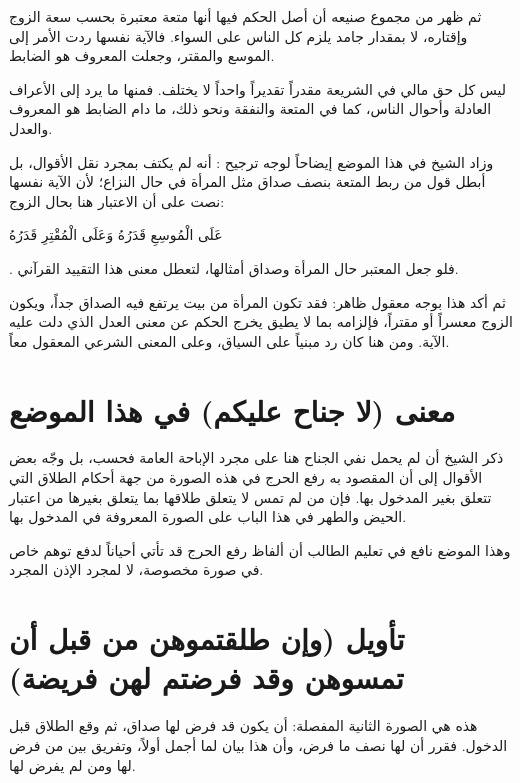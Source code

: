ثم ظهر من مجموع صنيعه أن أصل الحكم فيها أنها متعة معتبرة بحسب سعة الزوج وإقتاره، لا بمقدار جامد يلزم كل الناس على السواء. فالآية نفسها ردت الأمر إلى الموسع والمقتر، وجعلت المعروف هو الضابط.

\begin{fawaid}
ليس كل حق مالي في الشريعة مقدراً تقديراً واحداً لا يختلف. فمنها ما يرد إلى الأعراف العادلة وأحوال الناس، كما في المتعة والنفقة ونحو ذلك، ما دام الضابط هو المعروف والعدل.
\end{fawaid}

وزاد الشيخ في هذا الموضع إيضاحاً لوجه ترجيح : أنه لم يكتف بمجرد نقل الأقوال، بل أبطل قول من ربط المتعة بنصف صداق مثل المرأة في حال النزاع؛ لأن الآية نفسها نصت على أن الاعتبار هنا بحال الزوج: \begin{ayah}عَلَى الْمُوسِعِ قَدَرُهُ وَعَلَى الْمُقْتِرِ قَدَرُهُ\end{ayah}. فلو جعل المعتبر حال المرأة وصداق أمثالها، لتعطل معنى هذا التقييد القرآني.

ثم أكد هذا بوجه معقول ظاهر: فقد تكون المرأة من بيت يرتفع فيه الصداق جداً، ويكون الزوج معسراً أو مقتراً، فإلزامه بما لا يطيق يخرج الحكم عن معنى العدل الذي دلت عليه الآية. ومن هنا كان رد  مبنياً على السياق، وعلى المعنى الشرعي المعقول معاً.

\section{معنى (لا جناح عليكم) في هذا الموضع}
ذكر الشيخ أن  لم يحمل نفي الجناح هنا على مجرد الإباحة العامة فحسب، بل وجّه بعض الأقوال إلى أن المقصود به رفع الحرج في هذه الصورة من جهة أحكام الطلاق التي تتعلق بغير المدخول بها. فإن من لم تمس لا يتعلق طلاقها بما يتعلق بغيرها من اعتبار الحيض والطهر في هذا الباب على الصورة المعروفة في المدخول بها.

وهذا الموضع نافع في تعليم الطالب أن ألفاظ رفع الحرج قد تأتي أحياناً لدفع توهم خاص في صورة مخصوصة، لا لمجرد الإذن المجرد.

\separator

\section{تأويل (وإن طلقتموهن من قبل أن تمسوهن وقد فرضتم لهن فريضة)}
هذه هي الصورة الثانية المفصلة: أن يكون قد فرض لها صداق، ثم وقع الطلاق قبل الدخول. فقرر  أن لها نصف ما فرض، وأن هذا بيان لما أجمل أولاً، وتفريق بين من فرض لها ومن لم يفرض لها.

